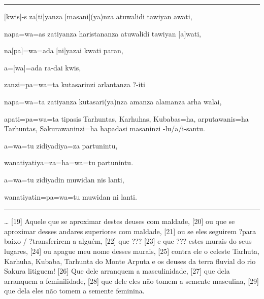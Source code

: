 \vspace{10pt}
\hrule
\vspace{10pt}


\setcounter{parcount}{18}
\begin{parnumbersa}[]

	\raggedright%
	\itshape%



	$[$kwis$]$-s za$[$ti$]$yanza $[$masani$]${(ya)}nza atuwalidi
	tawiyan awati,

	napa=wa=as zatiyanza haristananza atuwalidi tawiyan $[$a$]$wati,

	na$[$pa$]$=wa=ada $[$ni$]$yazai kwati paran,

	a=$[$wa$]$=ada ra-dai kwis,

	zanzi=pa=wa=ta kutasarinzi arlantanza {?}-iti

	napa=wa=ta zatiyanza kutasari{(ya)}nza amanza alamanza arha walai,

	apati=pa=wa=ta tipasis Tarhuntas, Karhuhas, Kubabas=ha, arputawanis=ha
	Tarhuntas, Sakurawaninzi=ha hapadasi masaninzi -lu/a/i-santu.

	a=wa=tu zidiyadiya=za partunintu,

	wanatiyatiya=za=ha=wa=tu partunintu.

	a=wa=tu zidiyadin muwidan nis lanti,

	wanatiyatin=pa=wa=tu muwidan ni lanti.

\end{parnumbersa}

\vspace{10pt}
\hrule
\vspace{10pt}



\ldots{}
[19] Aquele que se aproximar destes deuses com maldade,
[20] ou que se aproximar desses andares superiores com maldade,
[21] ou se eles seguirem {?}para baixo / {?}transferirem a alguém,
[22] que {???}
	[23] e que {???} estes murais do seus lugares,
[24] ou apague meu nome desses murais,
[25] contra ele o celeste Tarhuta, Karhuha, Kubaba, Tarhunta do Monte Arputa e
os deuses da terra fluvial do rio Sakura litiguem!
[26] Que dele arranquem a masculinidade,
[27] que dela arranquem a feminilidade,
[28] que dele eles não tomem a semente masculina,
[29] que dela eles não tomem a semente feminina.


